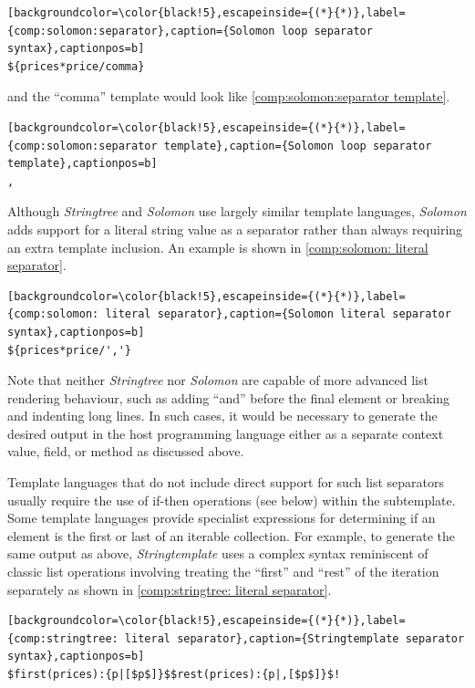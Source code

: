 \begin{lstlisting}[backgroundcolor=\color{black!5},escapeinside={(*}{*)},label={comp:solomon:separator},caption={Solomon loop separator syntax},captionpos=b]
${prices*price/comma}
\end{lstlisting}

and the \enquote{comma} template would look like \autoref{comp:solomon:separator template}.

\begin{lstlisting}[backgroundcolor=\color{black!5},escapeinside={(*}{*)},label={comp:solomon:separator template},caption={Solomon loop separator template},captionpos=b]
, 
\end{lstlisting}

Although \emph{Stringtree} and \emph{Solomon} use largely similar \gls{template language}s, \emph{Solomon} adds support for a literal string value as a separator rather than always requiring an extra template inclusion. An example is shown in \autoref{comp:solomon: literal separator}.

\begin{lstlisting}[backgroundcolor=\color{black!5},escapeinside={(*}{*)},label={comp:solomon: literal separator},caption={Solomon literal separator syntax},captionpos=b]
${prices*price/','}
\end{lstlisting}

Note that neither \emph{Stringtree} nor \emph{Solomon} are capable of more advanced list rendering behaviour, such as adding \enquote{and} before the final element or breaking and indenting long lines. In such cases, it would be necessary to generate the desired output in the host \gls{programming language} either as a separate context value, field, or method as discussed above.

Template languages that do not include direct support for such list separators usually require the use of if-then operations (see below) within the subtemplate. Some \gls{template language}s provide specialist expressions for determining if an element is the first or last of an iterable collection. For example, to generate the same output as above, \emph{Stringtemplate} uses a complex syntax reminiscent of classic list operations involving treating the \enquote{first} and \enquote{rest} of the iteration separately as shown in \autoref{comp:stringtree: literal separator}.

\begin{lstlisting}[backgroundcolor=\color{black!5},escapeinside={(*}{*)},label={comp:stringtree: literal separator},caption={Stringtemplate separator syntax},captionpos=b]
$first(prices):{p|[$p$]}$$rest(prices):{p|,[$p$]}$!
\end{lstlisting}


